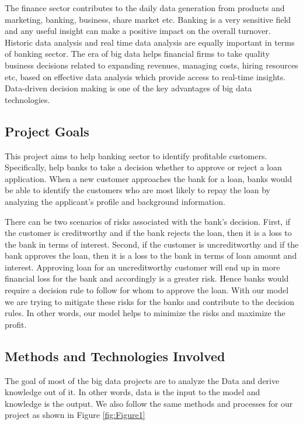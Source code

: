 \documentclass[sigconf]{acmart}
\begin{document}
The finance sector contributes to the daily data generation from products and marketing, banking, business, share market etc. Banking is a very sensitive field and any useful insight can make a positive impact on the overall turnover. Historic data analysis and real time data analysis are equally important in terms of banking sector. The era of big data helps financial firms to take quality business decisions related to expanding revenues, managing costs, hiring resources etc, based on effective data analysis which provide access to real-time insights. Data-driven decision making is one of the key advantages of big data technologies.

\subsection{Project Goals}

This project aims to help banking sector to identify profitable customers. Specifically, help banks to take a decision whether to approve or reject a loan application. When a new customer approaches the bank for a loan, banks would be able to identify the customers who are most likely to repay the loan by analyzing the applicant's profile and background information. 

There can be two scenarios of risks associated with the bank's decision. First, if the customer is creditworthy and if the bank rejects the loan, then it is a loss to the bank in terms of interest. Second, if the customer is uncreditworthy and if the bank approves the loan, then it is a loss to the bank in terms of loan amount and interest. Approving loan for an uncreditworthy customer will end up in more financial loss for the bank and accordingly is a greater risk. Hence banks would require a decision rule to follow for whom to approve the loan. With our model we are trying to mitigate these risks for the banks and contribute to the decision rules. In other words, our model helps to minimize the risks and maximize the profit.

\subsection{Methods and Technologies Involved}

The goal of most of the big data projects are to analyze the Data and derive knowledge out of it. In other words, data is the input to the model and knowledge is the output. We also follow the same methods and processes for our project as shown in Figure \ref{fig:Figure1}
\end{document}
